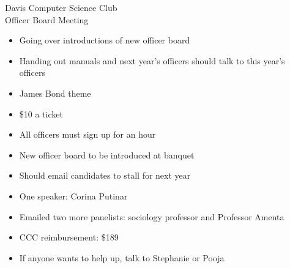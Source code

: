 \documentclass{article}
\begin{document}
\begin{Minutes}{Davis Computer Science Club\\Officer Board Meeting}




\maketitle

\begin{itemize}
\item Going over introductions of new officer board
\item Handing out manuals and next year's officers should talk to this year's officers
\end{itemize}

\begin{itemize}
    \item James Bond theme
    \item \$10 a ticket
    \item All officers must sign up for an hour 
    \item New officer board to be introduced at banquet
\end{itemize}

\begin {itemize}
\item Should email candidates to stall for next year
\end {itemize}

\begin{itemize}
\item One speaker: Corina Putinar
\item Emailed two more panelists: sociology professor and Professor Amenta
\item CCC reimbursement: \$189
\item If anyone wants to help up, talk to Stephanie or Pooja
\end{itemize}


\end{Minutes}
\end{document}
